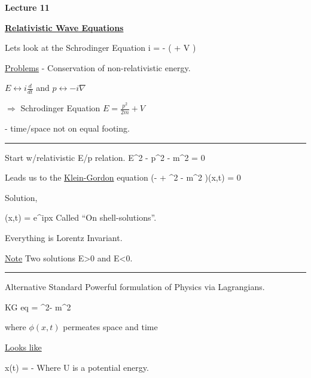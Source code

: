 \def\adagger{\ensuremath{a_{p\sigma}^\dagger}}


\usepackage{fancyhdr}

\fancyhf{}


\thispagestyle{fancy}

\begin{center}
{\huge \textbf{Lecture 11}}
\end{center}

{\fontsize{14}{16}\selectfont

\textbf{\underline{Relativistic Wave Equations}} 

Lets look at the Schrodinger Equation
\be
i \psi = - \left(  + V \right) \psi
\ee

\underline{Problems} 
- Conservation of non-relativistic energy.


$E \leftrightarrow i \frac{d}{dt}$ 
and
$p \leftrightarrow -i \nabla$


$\Rightarrow$ Schrodinger Equation $E = \frac{p^2}{2m} + V$

- time/space not on equal footing.


\noindent\rule{\textwidth}{1pt}

Start w/relativistic E/p relation.
\be
E^2 - p^2 - m^2 = 0
\ee

Leads us to the \underline{Klein-Gordon} equation
\be
\left(- + \nabla^2 - m^2 \right)\phi(x,t) = 0
\ee


Solution, 

\be
\phi(x,t) = e^{ipx}
\ee
Called ``On shell-solutions''.

Everything is Lorentz Invariant. 

\underline{Note} Two solutions E>0 and E<0.

\noindent\rule{\textwidth}{1pt}

Alternative Standard Powerful formulation of Physics via Lagrangians.

KG eq
\be
{}\phi  =  \nabla^2\phi - m^2 \phi
\ee

where $\phi(x,t)$ permeates space and time

\underline{Looks like}

\be
{}x(t)  =  -
\ee
Where U is a potential energy.

}
